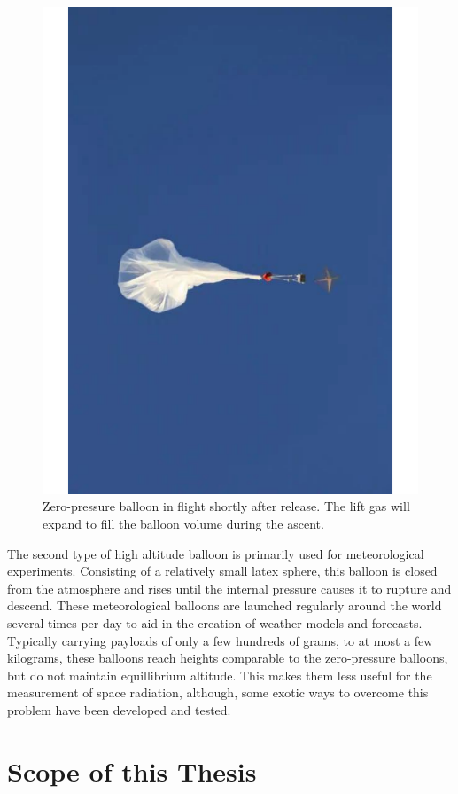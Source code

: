 \begin{figure}[p]
\label{zero_pressure_balloon_example}
\begin{centering}
\includegraphics[width=.7\textwidth,angle=270]{figures/chapter_1/zero_pressure_example/zero_pressure_example}
\caption{Zero-pressure balloon in flight shortly after release. The lift gas will expand to fill the balloon volume during the ascent.}
\end{centering}
\end{figure}
\newpage

The second type of high altitude balloon is primarily used for meteorological experiments. Consisting of a relatively small latex sphere, this balloon is closed from the atmosphere and rises until the internal pressure causes it to rupture and descend. These meteorological balloons are launched regularly around the world several times per day to aid in the creation of weather models and forecasts. Typically carrying payloads of only a few hundreds of grams, to at most a few kilograms, these balloons reach heights comparable to the zero-pressure balloons, but do not maintain equillibrium altitude. This makes them less useful for the measurement of space radiation, although, some exotic ways to overcome this problem have been developed and tested.


\section{Scope of this Thesis}


